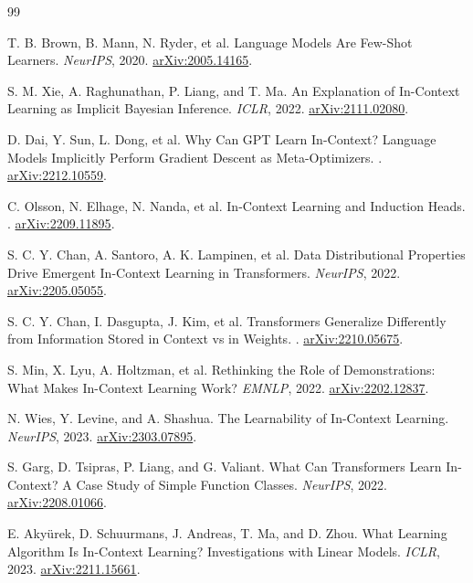 \documentclass[11pt,a4paper]{article}
\begin{document}
\clearpage
\begin{thebibliography}{99}
\small

T. B. Brown, B. Mann, N. Ryder, et al.
\newblock Language Models Are Few-Shot Learners.
\newblock \emph{NeurIPS}, 2020. \href{https://arxiv.org/abs/2005.14165}{arXiv:2005.14165}.

S. M. Xie, A. Raghunathan, P. Liang, and T. Ma.
\newblock An Explanation of In-Context Learning as Implicit Bayesian Inference.
\newblock \emph{ICLR}, 2022. \href{https://arxiv.org/abs/2111.02080}{arXiv:2111.02080}.

D. Dai, Y. Sun, L. Dong, et al.
\newblock Why Can GPT Learn In-Context? Language Models Implicitly Perform Gradient Descent as Meta-Optimizers.
. \href{https://arxiv.org/abs/2212.10559}{arXiv:2212.10559}.

C. Olsson, N. Elhage, N. Nanda, et al.
\newblock In-Context Learning and Induction Heads.
. \href{https://arxiv.org/abs/2209.11895}{arXiv:2209.11895}.

S. C. Y. Chan, A. Santoro, A. K. Lampinen, et al.
\newblock Data Distributional Properties Drive Emergent In-Context Learning in Transformers.
\newblock \emph{NeurIPS}, 2022. \href{https://arxiv.org/abs/2205.05055}{arXiv:2205.05055}.

S. C. Y. Chan, I. Dasgupta, J. Kim, et al.
\newblock Transformers Generalize Differently from Information Stored in Context vs in Weights.
. \href{https://arxiv.org/abs/2210.05675}{arXiv:2210.05675}.

S. Min, X. Lyu, A. Holtzman, et al.
\newblock Rethinking the Role of Demonstrations: What Makes In-Context Learning Work?
\newblock \emph{EMNLP}, 2022. \href{https://arxiv.org/abs/2202.12837}{arXiv:2202.12837}.

N. Wies, Y. Levine, and A. Shashua.
\newblock The Learnability of In-Context Learning.
\newblock \emph{NeurIPS}, 2023. \href{https://arxiv.org/abs/2303.07895}{arXiv:2303.07895}.

S. Garg, D. Tsipras, P. Liang, and G. Valiant.
\newblock What Can Transformers Learn In-Context? A Case Study of Simple Function Classes.
\newblock \emph{NeurIPS}, 2022. \href{https://arxiv.org/abs/2208.01066}{arXiv:2208.01066}.

E. Akyürek, D. Schuurmans, J. Andreas, T. Ma, and D. Zhou.
\newblock What Learning Algorithm Is In-Context Learning? Investigations with Linear Models.
\newblock \emph{ICLR}, 2023. \href{https://arxiv.org/abs/2211.15661}{arXiv:2211.15661}.


\end{thebibliography}
\end{document}
